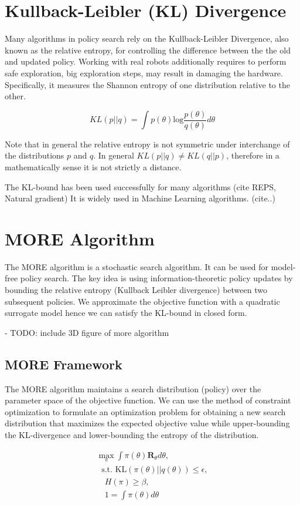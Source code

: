 \section{Kullback-Leibler (KL) Divergence}
Many algorithms in policy search rely on the Kullback-Leibler Divergence, also
known as the relative entropy, for controlling
the difference between the the old and updated policy.
Working with real robots additionally requires to perform safe exploration, big
exploration steps, may result in damaging the hardware.
Specifically, it measures the Shannon entropy of one distribution relative to the
other.

$$ KL(p || q) = \int p(\theta) \text{log} \frac{p(\theta)}{q(\theta)} d \theta $$

Note that in general the relative entropy is not symmetric under interchange of the
distributions $p$ and $q$. In general $KL(p || q) \neq KL(q || p) $, therefore
in a mathematically sense it is not strictly a distance.

The KL-bound has been used successfully for many algorithms (cite REPS, Natural gradient)
It is widely used in Machine Learning algorithms. (cite..)

\section{MORE Algorithm}
The MORE algorithm is a stochastic search algorithm. It can be used for
model-free policy search. The key idea is using information-theoretic policy updates
by bounding the relative entropy (Kullback Leibler divergence) between two subsequent
policies. We approximate the objective function with a quadratic surrogate model hence
we can satisfy the KL-bound in closed form.


- TODO: include 3D figure of more algorithm

\subsection{MORE Framework}
The MORE algorithm maintains a search distribution (policy) over the parameter space
of the objective function. We can use the method of constraint optimization
to formulate an optimization problem for obtaining a new search distribution that
maximizes the expected objective value while upper-bounding the KL-divergence and
lower-bounding the entropy of the distribution.

\begin{align}
 \max_{\pi} \int \pi(\theta) \mathbf{R}_{\theta} d\theta, \\
\; \text{ s.t. KL}(\pi(\theta)||q(\theta)) \leq \epsilon, \\
\quad H(\pi) \geq \beta, \\
\quad 1 = \int \pi(\theta) d\theta
\end{align}

